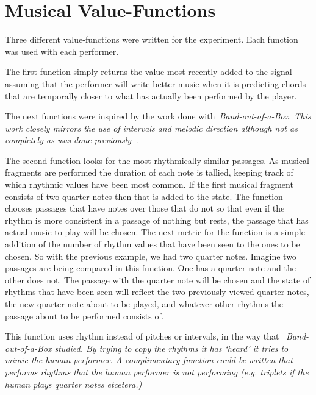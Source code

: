 \documentclass[12pt]{ucthesis}
\begin{document}
\section{Musical Value-Functions}
\label {musical-value-functions}
Three different value-functions were written for the experiment. Each function was used with each performer. 

The first function simply returns the value most recently added to the signal assuming that the performer will write better music when it is predicting chords that are temporally closer to what has actually been performed by the player.  

The next functions were inspired by the work done with~\em{Band-out-of-a-Box. }\em This work closely mirrors the use of intervals and melodic direction although not as completely as was done previously~\cite{bob}.

The second function looks for the most rhythmically similar passages. As musical fragments are performed the duration of each note is tallied, keeping track of which rhythmic values have been most common. If the first musical fragment consists of two quarter notes then that is added to the state. The function chooses passages that have notes over those that do not so that even if the rhythm is more consistent in a passage of nothing but rests, the passage that has actual music to play will be chosen. The next metric for the function is a simple addition of the number of rhythm values that have been seen to the ones to be chosen. So with the previous example, we had two quarter notes. Imagine two passages are being compared in this function. One has a quarter note and the other does not. The passage with the quarter note will be chosen and the state of rhythms that have been seen will reflect the two previously viewed quarter notes, the new quarter note about to be played, and whatever other rhythms the passage about to be performed consists of.

This function uses rhythm instead of pitches or intervals, in the way that ~\em{Band-out-of-a-Box }\em studied. By trying to copy the rhythms it has `heard' it tries to mimic the human performer. A complimentary function could be written that performs rhythms that the human performer is not performing (e.g. triplets if the human plays quarter notes etcetera.)
\end{document}
